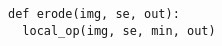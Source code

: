\documentclass[varwidth=4cm, border={0.1cm 0.1cm 0.1cm 0.1cm}]{standalone}
\begin{document}
\begin{verbatim}
def erode(img, se, out):
  local_op(img, se, min, out)
\end{verbatim}
\end{document}
